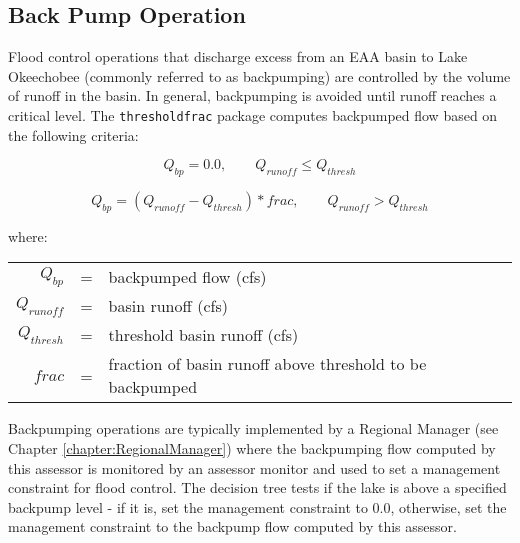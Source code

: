 \subsection{Back Pump Operation}

Flood control operations that discharge excess from an EAA basin to
Lake Okeechobee (commonly referred to as backpumping) are controlled by
the volume of runoff in the basin.  In general, backpumping is avoided
until runoff reaches a critical level.  The {\tt thresholdfrac}
package computes backpumped flow based on the following criteria:

\begin{equation}
	Q_{bp} = 0.0, \qquad Q_{runoff} \le Q_{thresh}
\end{equation}

\begin{equation}
	Q_{bp} = (Q_{runoff} - Q_{thresh}) * frac, \qquad Q_{runoff} > Q_{thresh}
\end{equation}

where:

\begin{center}
\begin{tabular}{rcl}
	$Q_{bp}$	&=& backpumped flow (cfs)					\\
	$Q_{runoff}$	&=& basin runoff (cfs)						\\
	$Q_{thresh}$	&=& threshold basin runoff (cfs)				\\
	$frac$		&=& fraction of basin runoff above threshold to be backpumped	\\
\end{tabular}
\end{center}

Backpumping operations are typically implemented by a Regional Manager
(see Chapter \ref{chapter:RegionalManager}) where the backpumping flow
computed by this assessor is monitored by an assessor monitor and used
to set a management constraint for flood control.  The decision tree
tests if the lake is above a specified backpump level \-- if it is,
set the management constraint to 0.0, otherwise, set the management
constraint to the backpump flow computed by this assessor.

